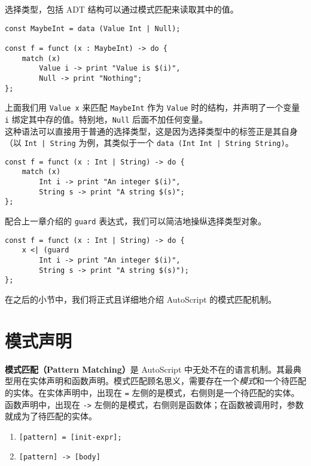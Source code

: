 选择类型，包括 ADT 结构可以通过模式匹配来读取其中的值。

\begin{lstlisting}
const MaybeInt = data (Value Int | Null);

const f = funct (x : MaybeInt) -> do {
	match (x)
		Value i -> print "Value is $(i)",
		Null -> print "Nothing";
};
\end{lstlisting}

上面我们用 \lstinline!Value x! 来匹配 \lstinline!MaybeInt! 作为 \lstinline!Value! 时的结构，并声明了一个变量 \lstinline!i! 绑定其中存的值。特别地，\lstinline!Null! 后面不加任何变量。 \\

这种语法可以直接用于普通的选择类型，这是因为选择类型中的标签正是其自身（以 \lstinline!Int | String! 为例，其类似于一个 \lstinline!data (Int Int | String String)!。

\begin{lstlisting}
const f = funct (x : Int | String) -> do {
	match (x)
		Int i -> print "An integer $(i)",
		String s -> print "A string $(s)";
};
\end{lstlisting}

配合上一章介绍的 \lstinline!guard! 表达式，我们可以简洁地操纵选择类型对象。

\begin{lstlisting}
const f = funct (x : Int | String) -> do {
	x <| (guard
		Int i -> print "An integer $(i)",
		String s -> print "A string $(s)");
};
\end{lstlisting}

在之后的小节中，我们将正式且详细地介绍 AutoScript 的模式匹配机制。


\section{模式声明}

\textbf{模式匹配（Pattern Matching）}是 AutoScript 中无处不在的语言机制。其最典型用在实体声明和函数声明。模式匹配顾名思义，需要存在一个\emph{模式}和一个待匹配的实体。在实体声明中，出现在 \lstinline!=! 左侧的是模式，右侧则是一个待匹配的实体。函数声明中，出现在 \lstinline!->! 左侧的是模式，右侧则是函数体；在函数被调用时，参数就成为了待匹配的实体。

\begin{grammar}[模式匹配]
\begin{enumerate}
    \item \lstinline![pattern] = [init-expr];!
    \item \lstinline![pattern] -> [body]!
\end{enumerate}
\end{grammar}



